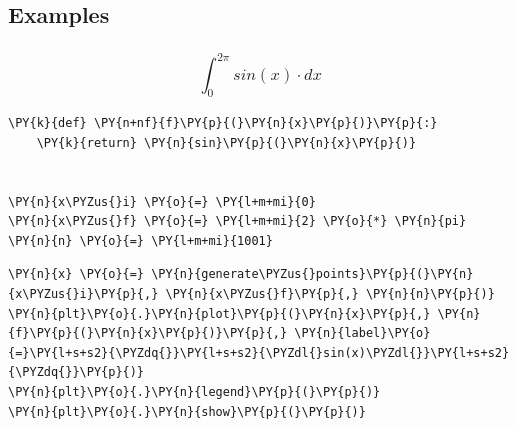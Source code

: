     \hypertarget{examples}{%
\subsection{Examples}\label{examples}}

    \hypertarget{int_02pi-sinx-cdot-dx}{%
\subsubsection{\texorpdfstring{\[\int_{0}^{2\pi} sin(x) \cdot dx\]}{\textbackslash int\_\{0\}\^{}\{2\textbackslash pi\} sin(x) \textbackslash cdot dx}}\label{int_02pi-sinx-cdot-dx}}

    \begin{tcolorbox}[breakable, size=fbox, boxrule=1pt, pad at break*=1mm,colback=cellbackground, colframe=cellborder]
\begin{Verbatim}[commandchars=\\\{\}]
\PY{k}{def} \PY{n+nf}{f}\PY{p}{(}\PY{n}{x}\PY{p}{)}\PY{p}{:}
    \PY{k}{return} \PY{n}{sin}\PY{p}{(}\PY{n}{x}\PY{p}{)}


\PY{n}{x\PYZus{}i} \PY{o}{=} \PY{l+m+mi}{0}
\PY{n}{x\PYZus{}f} \PY{o}{=} \PY{l+m+mi}{2} \PY{o}{*} \PY{n}{pi}
\PY{n}{n} \PY{o}{=} \PY{l+m+mi}{1001}
\end{Verbatim}
\end{tcolorbox}

    \begin{tcolorbox}[breakable, size=fbox, boxrule=1pt, pad at break*=1mm,colback=cellbackground, colframe=cellborder]
\begin{Verbatim}[commandchars=\\\{\}]
\PY{n}{x} \PY{o}{=} \PY{n}{generate\PYZus{}points}\PY{p}{(}\PY{n}{x\PYZus{}i}\PY{p}{,} \PY{n}{x\PYZus{}f}\PY{p}{,} \PY{n}{n}\PY{p}{)}
\PY{n}{plt}\PY{o}{.}\PY{n}{plot}\PY{p}{(}\PY{n}{x}\PY{p}{,} \PY{n}{f}\PY{p}{(}\PY{n}{x}\PY{p}{)}\PY{p}{,} \PY{n}{label}\PY{o}{=}\PY{l+s+s2}{\PYZdq{}}\PY{l+s+s2}{\PYZdl{}sin(x)\PYZdl{}}\PY{l+s+s2}{\PYZdq{}}\PY{p}{)}
\PY{n}{plt}\PY{o}{.}\PY{n}{legend}\PY{p}{(}\PY{p}{)}
\PY{n}{plt}\PY{o}{.}\PY{n}{show}\PY{p}{(}\PY{p}{)}
\end{Verbatim}
\end{tcolorbox}

    \begin{center}
    \end{center}
    { \hspace*{\fill} \\}
    
